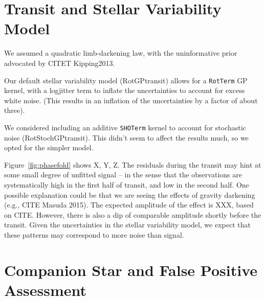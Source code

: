 \documentclass[12pt,modern,tighten]{aastex63}
\begin{document}
\section{Transit and Stellar Variability Model}
\label{app:gptransit}

We assumed a quadratic limb-darkening law, with the uninformative prior
advocated by CITET Kipping2013.


Our default stellar variability model (RotGPtransit) allows for a
\texttt{RotTerm} GP kernel, with a logjitter term to inflate the
uncertainties to account for excess white noise.
(This results in an inflation of the uncertainties by a factor
of about three).

We considered including an additive \texttt{SHOTerm} kernel to account
for stochastic noise (RotStochGPtransit).  This didn't seem to affect the results much, so
we opted for the simpler model.



Figure~\ref{fig:phasefold} shows X, Y, Z.  The residuals during the
transit may hint at some small degree of unfitted signal -- in the
sense that the observations are systematically high in the first half
of transit, and low in the second half.  
One possible explanation could be that we are seeing the effects of
gravity darkening (e.g., CITE Masuda 2015).
The expected amplitude of the effect is XXX, based on CITE.
However, there is also a dip of comparable amplitude shortly before
the transit. 
Given the uncertainties in the stellar variability model, we expect
that these patterns may correspond to more noise than signal.

\section{Companion Star and False Positive Assessment}
\label{app:companionstar}
\end{document}
